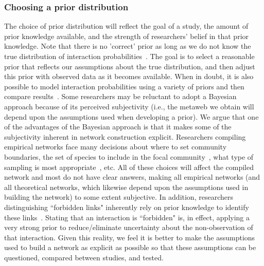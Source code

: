 \documentclass[12pt]{article}
\begin{document}
\begin{spacing}{2.0}


    \subsubsection*{Choosing a prior distribution}  

      The choice of prior distribution will reflect the goal of a study, the amount of prior knowledge available, and the strength of researchers' belief in that prior knowledge. Note that there is no 'correct' prior as long as we do not know the true distribution of interaction probabilities~\citep{Spiegelhalter2000}. The goal is to select a reasonable prior that reflects our assumptions about the true distribution, and then adjust this prior with observed data as it becomes available. When in doubt, it is also possible to model interaction probabilities using a variety of priors and then compare results~\citep{Spiegelhalter2000}. Some researchers may be reluctant to adopt a Bayesian approach because of its perceived subjectivity (i.e., the metaweb we obtain will depend upon the assumptions used when developing a prior). We argue that one of the advantages of the Bayesian approach is that it makes some of the subjectivity inherent in network construction explicit. Researchers compiling empirical networks face many decisions about where to set community boundaries, the set of species to include in the focal community~\citep{Jordano2016}, what type of sampling is most appropriate~\citep{Wirta2014}, etc. All of these choices will affect the compiled network and most do not have clear answers, making all empirical networks (and all theoretical networks, which likewise depend upon the assumptions used in building the network) to some extent subjective. In addition, researchers distinguishing ``forbidden links" inherently rely on prior knowledge to identify these links~\citep{Jordano2016}. Stating that an interaction is ``forbidden" is, in effect, applying a very strong prior to reduce/eliminate uncertainty about the non-observation of that interaction. Given this reality, we feel it is better to make the assumptions used to build a network as explicit as possible so that these assumptions can be questioned, compared between studies, and tested. 



\end{spacing}
\end{document}
